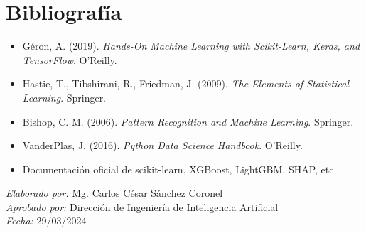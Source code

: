 \documentclass[12pt,a4paper,openany,oneside]{book}
\begin{document}
\chapter*{Bibliografía}

\begin{itemize}
    \item Géron, A. (2019). \textit{Hands-On Machine Learning with Scikit-Learn, Keras, and TensorFlow}. O'Reilly.
    \item Hastie, T., Tibshirani, R., Friedman, J. (2009). \textit{The Elements of Statistical Learning}. Springer.
    \item Bishop, C. M. (2006). \textit{Pattern Recognition and Machine Learning}. Springer.
    \item VanderPlas, J. (2016). \textit{Python Data Science Handbook}. O'Reilly.
    \item Documentación oficial de scikit-learn, XGBoost, LightGBM, SHAP, etc.
\end{itemize}

\vspace{1cm}
\begin{flushright}
\textit{Elaborado por:} Mg. Carlos César Sánchez Coronel \\
\textit{Aprobado por:} Dirección de Ingeniería de Inteligencia Artificial \\
\textit{Fecha:} 29/03/2024
\end{flushright}
\end{document}
